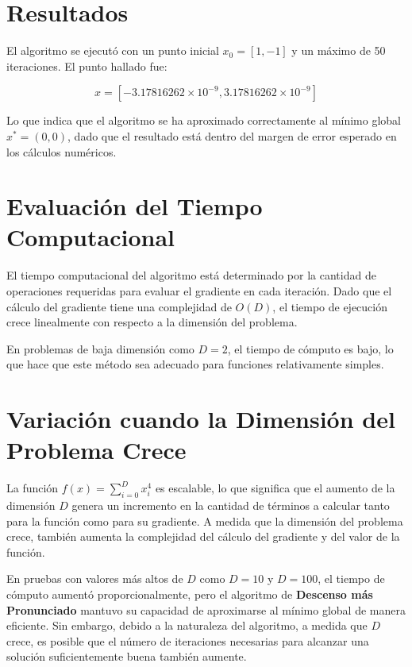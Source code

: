 \documentclass{article}
\begin{document}
\section{Resultados}

El algoritmo se ejecutó con un punto inicial \( x_0 = [1, -1] \) y un máximo de 50 iteraciones. El punto hallado fue:

\[
x = [-3.17816262 \times 10^{-9}, 3.17816262 \times 10^{-9}]
\]

Lo que indica que el algoritmo se ha aproximado correctamente al mínimo global \( x^* = (0, 0)\), dado que el resultado está dentro del margen de error esperado en los cálculos numéricos.

\section{Evaluación del Tiempo Computacional}

El tiempo computacional del algoritmo está determinado por la cantidad de operaciones requeridas para evaluar el gradiente en cada iteración. Dado que el cálculo del gradiente tiene una complejidad de \( O(D) \), el tiempo de ejecución crece linealmente con respecto a la dimensión del problema.

En problemas de baja dimensión como \( D = 2 \), el tiempo de cómputo es bajo, lo que hace que este método sea adecuado para funciones relativamente simples.

\section{Variación cuando la Dimensión del Problema Crece}

La función \( f(x) = \sum_{i=0}^{D} x_i^4 \) es escalable, lo que significa que el aumento de la dimensión \( D \) genera un incremento en la cantidad de términos a calcular tanto para la función como para su gradiente. A medida que la dimensión del problema crece, también aumenta la complejidad del cálculo del gradiente y del valor de la función.

En pruebas con valores más altos de \( D \) como \( D = 10 \) y \( D = 100 \), el tiempo de cómputo aumentó proporcionalmente, pero el algoritmo de \textbf{Descenso más Pronunciado} mantuvo su capacidad de aproximarse al mínimo global de manera eficiente. Sin embargo, debido a la naturaleza del algoritmo, a medida que \( D \) crece, es posible que el número de iteraciones necesarias para alcanzar una solución suficientemente buena también aumente.
\end{document}
